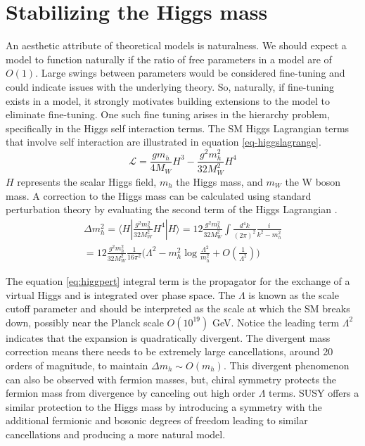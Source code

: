 \section{Stabilizing the Higgs mass}

An aesthetic attribute of theoretical models is naturalness. We should expect a model to function naturally if the ratio of free parameters in a model are of $O(1)$. Large swings between parameters would be considered fine-tuning and could indicate issues with the underlying theory. So, naturally, if fine-tuning exists in a model, it strongly motivates building extensions to the model to eliminate fine-tuning. %
One such fine tuning arises in the hierarchy problem, specifically in the Higgs self interaction terms. The SM Higgs Lagrangian terms that involve self interaction are illustrated in equation \ref{eq-higgslagrange}.
\begin{equation}
\label{eq-higgslagrange}
\mathcal{L}=\frac{gm_h}{4M_W}H^3 - \frac{g^2m_h^2}{32M_W^2}H^4
\end{equation}
$H$ represents the scalar Higgs field, $m_h$ the Higgs mass, and $m_W$ the W boson  mass. A correction to the Higgs mass can be calculated using standard perturbation theory by evaluating the second term of the Higgs Lagrangian \cite{Baer:2007izw}. 
\begin{equation}
\label{eq:higgpert}
\begin{split}
\Delta m_h^2 = \langle H | \frac{g^2m_h^2}{32M_W^2} H^4 | H  \rangle = 12\frac{g^2m_h^2}{32M_W^2}\int \frac{d^4 k}{(2\pi)^2} \frac{i}{k^2 - m_h^2}\\
= 12\frac{g^2m_h^2}{32M_W^2} \frac{1}{16\pi^2}\big( \Lambda^2 - m_h^2\log\frac{\Lambda^2}{m_h^2} + O(\frac{1}{\Lambda^2})\big)
\end{split} 
\end{equation}
 
The equation \ref{eq:higgpert} integral term is the propagator for the exchange of a virtual Higgs and is integrated over phase space. The $\Lambda$ is known as the scale cutoff parameter and should be interpreted as the scale at which the SM breaks down, possibly near the Planck scale $O(10^{19})$ GeV. Notice the leading term $\Lambda^2$ indicates that the expansion is quadratically divergent. The divergent mass correction means there needs to be extremely large cancellations, around 20 orders of magnitude, to maintain $\Delta m_h \sim O(m_h)$. This divergent phenomenon can also be observed with fermion masses, but, chiral symmetry protects the fermion mass from divergence by canceling out high order $\Lambda$ terms. SUSY offers a similar protection to the Higgs mass by introducing a symmetry with the additional fermionic and bosonic degrees of freedom leading to similar cancellations and producing a more natural model. 


